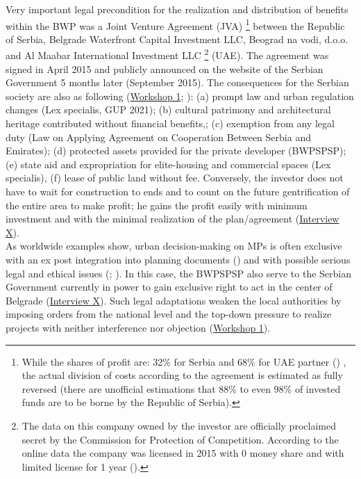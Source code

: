\documentclass[11pt]{report}
\begin{document}
Very important legal precondition for the realization and distribution of benefits within the BWP was a Joint Venture Agreement (JVA)
\footnote{While the shares of profit are: 32\% for Serbia and 68\% for UAE partner (\cite{JVA BWP, 2015}) %
, the actual division of costs according to the agreement is estimated as fully reversed (there are unofficial estimations that 88\% to even 98\% of invested funds are to be borne by the Republic of Serbia).}
between the Republic of Serbia, Belgrade Waterfront Capital Investment LLC, Beograd na vodi, d.o.o. and Al Maabar International Investment LLC
\footnote{The data on this company owned by the investor are officially proclaimed secret by the Commission for Protection of Competition.
According to the online data the company was licensed in 2015 with 0 money share and with limited license for 1 year (\cite{AnalizaUgovoraNDVBGD2016}).} 
(UAE).
The agreement was signed in April 2015 and publicly announced on the website of the Serbian Government 5 months later (September 2015).
The consequences for the Serbian society are also as following 
(\href{Expert Workshop}{Workshop 1}; \cite{zekovic_megaprojects_2016}):
(a) prompt law and urban regulation changes (Lex specialis, GUP 2021);
(b) cultural patrimony and architectural heritage contributed without financial benefits,;
(c) exemption from any legal duty (Law on Applying Agreement on Cooperation Between Serbia and Emirates);
(d) protected assets provided for the private developer (BWPSPSP);
(e) state aid and expropriation for elite-housing and commercial spaces (Lex specialis),
(f) lease of public land without fee.
Conversely, the investor does not have to wait for construction to ends and to count on the future gentrification of the entire area to make profit; he gains the profit easily with minimum investment and with the minimal realization of the plan/agreement
(\href{InterviewX}{Interview X}).
\\

As worldwide examples show, urban decision-making on MPs is often exclusive with an ex post integration into planning documents (\cite{Kennedy et al., 2014})
and with possible serious legal and ethical issues (\cite{Flyvbjerg2009}; \cite{Flyvbjerg et al. 2003}).
In this case, the BWPSPSP also serve to the Serbian Government currently in power to gain exclusive right to act in the center of Belgrade (\href{InterviewX}{Interview X}).
Such legal adaptations weaken the local authorities by imposing orders from the national level and the top-down pressure to realize projects with neither interference nor objection
(\href{Expert Workshop}{Workshop 1}).
\\
\end{document}
